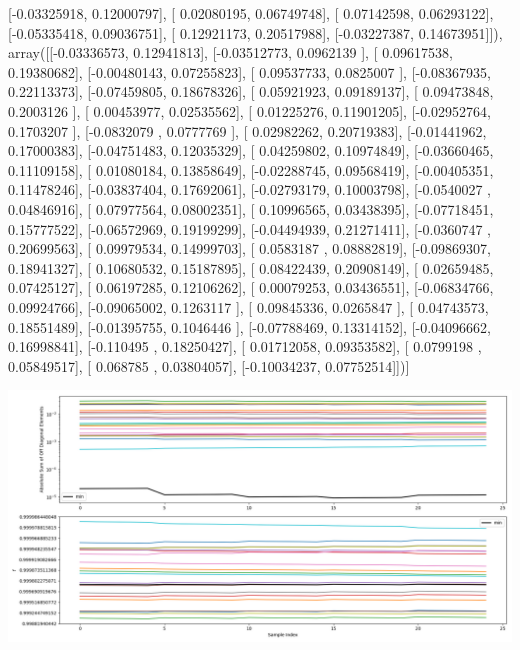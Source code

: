 \documentclass{article}
\begin{document}
       [-0.03325918,  0.12000797],
       [ 0.02080195,  0.06749748],
       [ 0.07142598,  0.06293122],
       [-0.05335418,  0.09036751],
       [ 0.12921173,  0.20517988],
       [-0.03227387,  0.14673951]]), array([[-0.03336573,  0.12941813],
       [-0.03512773,  0.0962139 ],
       [ 0.09617538,  0.19380682],
       [-0.00480143,  0.07255823],
       [ 0.09537733,  0.0825007 ],
       [-0.08367935,  0.22113373],
       [-0.07459805,  0.18678326],
       [ 0.05921923,  0.09189137],
       [ 0.09473848,  0.2003126 ],
       [ 0.00453977,  0.02535562],
       [ 0.01225276,  0.11901205],
       [-0.02952764,  0.1703207 ],
       [-0.0832079 ,  0.0777769 ],
       [ 0.02982262,  0.20719383],
       [-0.01441962,  0.17000383],
       [-0.04751483,  0.12035329],
       [ 0.04259802,  0.10974849],
       [-0.03660465,  0.11109158],
       [ 0.01080184,  0.13858649],
       [-0.02288745,  0.09568419],
       [-0.00405351,  0.11478246],
       [-0.03837404,  0.17692061],
       [-0.02793179,  0.10003798],
       [-0.0540027 ,  0.04846916],
       [ 0.07977564,  0.08002351],
       [ 0.10996565,  0.03438395],
       [-0.07718451,  0.15777522],
       [-0.06572969,  0.19199299],
       [-0.04494939,  0.21271411],
       [-0.0360747 ,  0.20699563],
       [ 0.09979534,  0.14999703],
       [ 0.0583187 ,  0.08882819],
       [-0.09869307,  0.18941327],
       [ 0.10680532,  0.15187895],
       [ 0.08422439,  0.20908149],
       [ 0.02659485,  0.07425127],
       [ 0.06197285,  0.12106262],
       [ 0.00079253,  0.03436551],
       [-0.06834766,  0.09924766],
       [-0.09065002,  0.1263117 ],
       [ 0.09845336,  0.0265847 ],
       [ 0.04743573,  0.18551489],
       [-0.01395755,  0.1046446 ],
       [-0.07788469,  0.13314152],
       [-0.04096662,  0.16998841],
       [-0.110495  ,  0.18250427],
       [ 0.01712058,  0.09353582],
       [ 0.0799198 ,  0.05849517],
       [ 0.068785  ,  0.03804057],
       [-0.10034237,  0.07752514]])]
\begin{center}
\includegraphics[scale=.9]{report_pickled_controls183/control_dpn_all.png}

\end{center}
\end{document}
